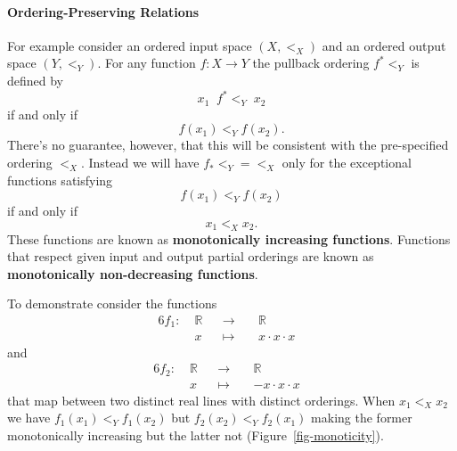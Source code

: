 \documentclass[
  letterpaper,
  DIV=11,
  numbers=noendperiod]{scrartcl}
\let\oldparagraph\paragraph
\renewcommand{\paragraph}[1]{\oldparagraph{#1}\mbox{}}
\begin{document}
\hypertarget{ordering-preserving-relations}{%
\paragraph{Ordering-Preserving
Relations}\label{ordering-preserving-relations}}

For example consider an ordered input space \((X, <_{X})\) and an
ordered output space \((Y, <_{Y})\). For any function
\(f: X \rightarrow Y\) the pullback ordering \(f^{*} \!\! <_{Y}\) is
defined by \[
x_{1} \;\; f^{*}\!\!<_{Y} \; x_{2}
\] if and only if \[
f(x_{1}) <_{Y} f(x_{2}).
\] There's no guarantee, however, that this will be consistent with the
pre-specified ordering \(<_{X}\). Instead we will have
\(f_{*} <_{Y} = <_{X}\) only for the exceptional functions satisfying \[
f(x_{1}) <_{Y} f(x_{2})
\] if and only if \[
x_{1} <_{X} x_{2}.
\] These functions are known as \textbf{monotonically increasing
functions}. Functions that respect given input and output partial
orderings are known as \textbf{monotonically non-decreasing functions}.

To demonstrate consider the functions \begin{alignat*}{6}
f_1 :\; & \mathbb{R} & &\rightarrow& \; & \mathbb{R} &
\\
& x & &\mapsto& & x \cdot x \cdot x &
\end{alignat*} and \begin{alignat*}{6}
f_2 :\; & \mathbb{R} & &\rightarrow& \; & \mathbb{R} &
\\
& x & &\mapsto& & - x \cdot x \cdot x &
\end{alignat*} that map between two distinct real lines with distinct
orderings. When \(x_{1} <_{X} x_{2}\) we have
\(f_1(x_{1}) <_{Y} f_1(x_{2})\) but \(f_2(x_{2}) <_{Y} f_2(x_{1})\)
making the former monotonically increasing but the latter not
(Figure~\ref{fig-monoticity}).
\end{document}
